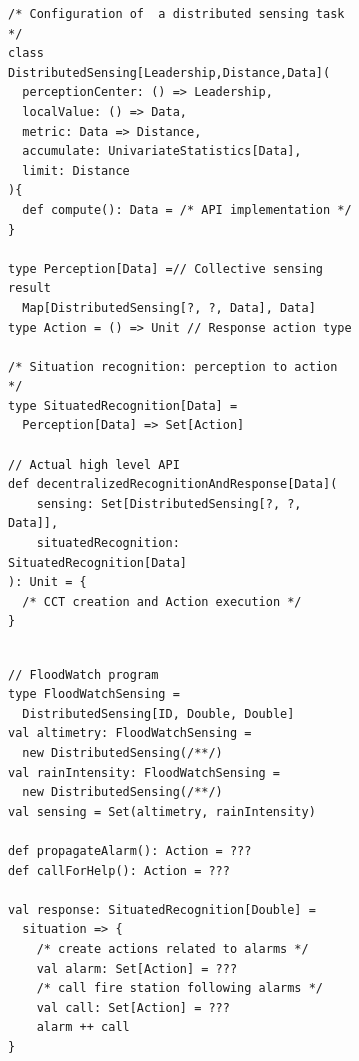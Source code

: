 \begin{figure}
  \begin{subfigure}[b]{0.49\linewidth}
    \centering
    \begin{lstlisting}[language=scafi]
/* Configuration of  a distributed sensing task */
class DistributedSensing[Leadership,Distance,Data](
  perceptionCenter: () => Leadership,
  localValue: () => Data,
  metric: Data => Distance,
  accumulate: UnivariateStatistics[Data],
  limit: Distance
){ 
  def compute(): Data = /* API implementation */ 
}

type Perception[Data] =// Collective sensing result
  Map[DistributedSensing[?, ?, Data], Data]
type Action = () => Unit // Response action type

/* Situation recognition: perception to action */
type SituatedRecognition[Data] =
  Perception[Data] => Set[Action]

// Actual high level API
def decentralizedRecognitionAndResponse[Data](
    sensing: Set[DistributedSensing[?, ?, Data]],
    situatedRecognition: SituatedRecognition[Data]
): Unit = { 
  /* CCT creation and Action execution */ 
}
    
\end{lstlisting}
  \label{code:api}
  \end{subfigure}
  \hfill
  \begin{subfigure}[b]{0.49\linewidth}
    \centering
\begin{lstlisting}[language=scafi]
// FloodWatch program
type FloodWatchSensing = 
  DistributedSensing[ID, Double, Double]
val altimetry: FloodWatchSensing = 
  new DistributedSensing(/**/)
val rainIntensity: FloodWatchSensing = 
  new DistributedSensing(/**/)
val sensing = Set(altimetry, rainIntensity)

def propagateAlarm(): Action = ???
def callForHelp(): Action = ???

val response: SituatedRecognition[Double] = 
  situation => {
    /* create actions related to alarms */
    val alarm: Set[Action] = ???
    /* call fire station following alarms */
    val call: Set[Action] = ???
    alarm ++ call
}


\end{lstlisting}
\end{subfigure}
\end{figure}
